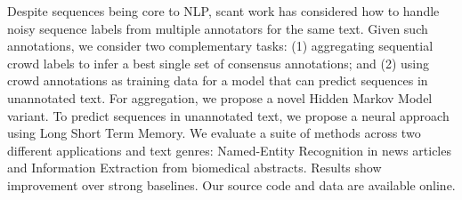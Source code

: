 Despite sequences being core to NLP, scant work has considered how to handle noisy sequence labels from multiple annotators for the same text. Given such annotations, we consider two complementary tasks:  (1) aggregating sequential crowd labels to infer a best single set of consensus annotations; and (2) using crowd annotations as training data for a model that can predict sequences in unannotated text. For aggregation, we propose a novel Hidden Markov Model variant. To predict sequences in unannotated text, we propose a neural approach using Long Short Term Memory. We evaluate a suite of methods across two different applications and text genres: Named-Entity Recognition in news articles and Information Extraction from biomedical abstracts. Results show improvement over strong baselines. Our source code and data are available online.
